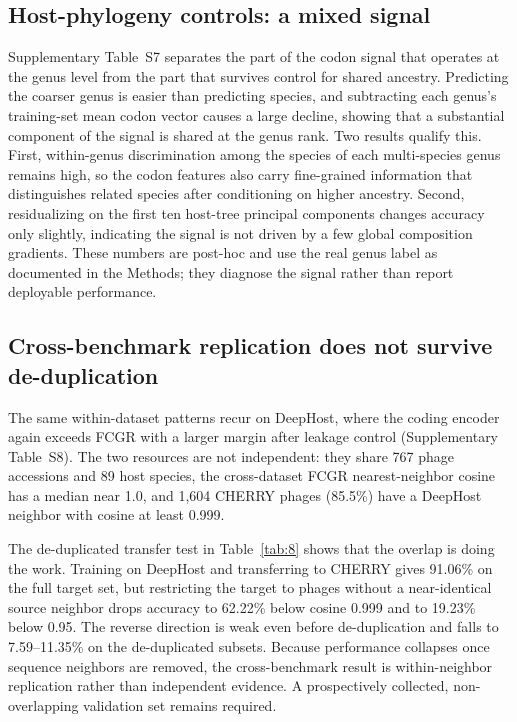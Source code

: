 \documentclass[utf8]{FrontiersinVancouver}
\begin{document}
\subsection{Host-phylogeny controls: a mixed signal}

Supplementary Table~S7 separates the part of the codon signal that operates at the genus level from the part that survives control for shared ancestry. Predicting the coarser genus is easier than predicting species, and subtracting each genus's training-set mean codon vector causes a large decline, showing that a substantial component of the signal is shared at the genus rank. Two results qualify this. First, within-genus discrimination among the species of each multi-species genus remains high, so the codon features also carry fine-grained information that distinguishes related species after conditioning on higher ancestry. Second, residualizing on the first ten host-tree principal components changes accuracy only slightly, indicating the signal is not driven by a few global composition gradients. These numbers are post-hoc and use the real genus label as documented in the Methods; they diagnose the signal rather than report deployable performance.

\subsection{Cross-benchmark replication does not survive de-duplication}

The same within-dataset patterns recur on DeepHost, where the coding encoder again exceeds FCGR with a larger margin after leakage control (Supplementary Table~S8). The two resources are not independent: they share 767 phage accessions and 89 host species, the cross-dataset FCGR nearest-neighbor cosine has a median near 1.0, and 1,604 CHERRY phages (85.5\%) have a DeepHost neighbor with cosine at least 0.999.

The de-duplicated transfer test in Table~\ref{tab:8} shows that the overlap is doing the work. Training on DeepHost and transferring to CHERRY gives 91.06\% on the full target set, but restricting the target to phages without a near-identical source neighbor drops accuracy to 62.22\% below cosine 0.999 and to 19.23\% below 0.95. The reverse direction is weak even before de-duplication and falls to 7.59--11.35\% on the de-duplicated subsets. Because performance collapses once sequence neighbors are removed, the cross-benchmark result is within-neighbor replication rather than independent evidence. A prospectively collected, non-overlapping validation set remains required.
\end{document}
